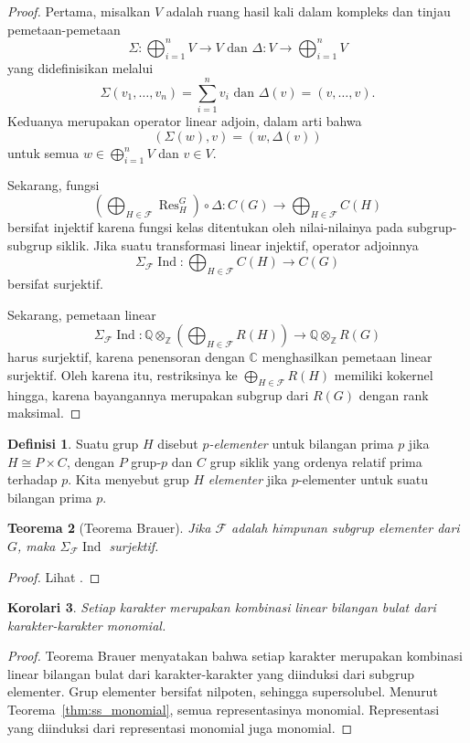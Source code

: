 \documentclass[12pt]{article}
\theoremstyle{plain}
\newtheorem{theorem}{Teorema}[section]
\newtheorem{corollary}[theorem]{Korolari}
\theoremstyle{definition}
\newtheorem{definition}[theorem]{Definisi}
\theoremstyle{remark}
\numberwithin{equation}{section}
\begin{document}
\begin{proof}
Pertama, misalkan $V$ adalah ruang hasil kali dalam kompleks dan tinjau pemetaan-pemetaan
\[
\Sigma : \bigoplus_{i=1}^n V \to V \textrm{ dan }
\Delta : V \to \bigoplus_{i=1}^n V
\]
yang didefinisikan melalui
\[
\Sigma\left(v_1,\ldots,v_n\right) = \sum_{i=1}^n v_i \textrm{ dan }
\Delta(v) = (v,\ldots,v).
\]
Keduanya merupakan operator linear adjoin, dalam arti bahwa
\[
\left( \Sigma(w), v \right) = \left( w, \Delta(v) \right)
\]
untuk semua $w \in \bigoplus_{i=1}^n V$ dan $v \in V$.

Sekarang, fungsi
\[
\left( \bigoplus_{H \in \mathcal{F}} \operatorname{Res}^G_H \right)
\circ \Delta: C(G) \to \bigoplus_{H \in \mathcal{F}} C(H)
\]
bersifat injektif karena fungsi kelas ditentukan oleh nilai-nilainya pada
subgrup-subgrup siklik.
Jika suatu transformasi linear injektif, operator adjoinnya
\[
\Sigma_{\mathcal{F}} \operatorname{Ind} :
\bigoplus_{H \in \mathcal{F}} C(H) \to C(G)
\]
bersifat surjektif.

Sekarang, pemetaan linear
\[
\Sigma_{\mathcal{F}} \operatorname{Ind} :
\mathbb{Q} \otimes_{\mathbb{Z}}
\left(\bigoplus_{H \in \mathcal{F}} R(H)\right)
\to \mathbb{Q} \otimes_{\mathbb{Z}} R(G)
\]
harus surjektif, karena penensoran dengan $\mathbb{C}$ menghasilkan
pemetaan linear surjektif.
Oleh karena itu, restriksinya ke $\bigoplus_{H \in \mathcal{F}} R(H)$
memiliki kokernel hingga, karena bayangannya merupakan subgrup dari $R(G)$
dengan rank maksimal.
\end{proof}

\begin{definition}
Suatu grup $H$ disebut \emph{$p$-elementer} untuk bilangan prima $p$ jika
$H \cong P \times C$, dengan $P$ grup-$p$ dan $C$ grup siklik
yang ordenya relatif prima terhadap $p$.
Kita menyebut grup $H$ \emph{elementer} jika $p$-elementer untuk suatu
bilangan prima $p$.
\end{definition}

\begin{theorem}[Teorema Brauer]
Jika $\mathcal{F}$ adalah himpunan subgrup elementer dari $G$,
maka $\Sigma_{\mathcal{F}} \operatorname{Ind}$ surjektif.
\end{theorem}

\begin{proof}
Lihat \cite[\S{10}]{Serre}.
\end{proof}

\begin{corollary}
Setiap karakter merupakan kombinasi linear bilangan bulat dari karakter-karakter monomial.
\end{corollary}

\begin{proof}
Teorema Brauer menyatakan bahwa setiap karakter merupakan kombinasi linear bilangan bulat
dari karakter-karakter yang diinduksi dari subgrup elementer.
Grup elementer bersifat nilpoten, sehingga supersolubel.
Menurut Teorema~\ref{thm:ss_monomial}, semua representasinya
monomial.
Representasi yang diinduksi dari representasi monomial juga monomial.
\end{proof}



\end{document}
